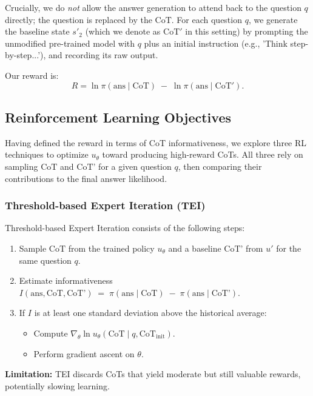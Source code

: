 \documentclass[letterpaper]{article} %
\begin{document}
Crucially, we do \emph{not} allow the answer generation to attend back to the question $q$ directly; the question is replaced by the $\text{CoT}$. For each question $q$, we generate the baseline state $s'_2$ (which we denote as $\text{CoT}'$ in this setting) by prompting the unmodified pre-trained model with $q$ plus an initial instruction (e.g., 'Think step-by-step...'), and recording its raw output.

Our reward is:
\[
R = \ln \pi(\text{ans} \mid \text{CoT}) \;-\; \ln \pi(\text{ans} \mid \text{CoT}').
\]

\subsection{Reinforcement Learning Objectives}
\label{subsec:rl_objectives}
Having defined the reward in terms of CoT informativeness, we explore three RL techniques to optimize $u_\theta$ toward producing high-reward CoTs. All three rely on sampling $\text{CoT}$ and $\text{CoT'}$ for a given question $q$, then comparing their contributions to the final answer likelihood. 

\subsubsection{Threshold-based Expert Iteration (TEI)}
\label{subsubsec:tei}
Threshold-based Expert Iteration consists of the following steps:
\begin{enumerate}
    \item Sample $\text{CoT}$ from the trained policy $u_\theta$ and a baseline $\text{CoT'}$ from $u'$ for the same question $q$.
    \item Estimate informativeness $I(\text{ans}, \text{CoT}, \text{CoT'}) \;=\; \pi(\text{ans}\mid \text{CoT}) \;-\; \pi(\text{ans}\mid \text{CoT'})$.
    \item If $I$ is at least one standard deviation above the historical average:
\begin{itemize}
            \item Compute $\nabla_\theta \ln u_\theta(\text{CoT} \mid q, \text{CoT}_{\text{init}})$.
            \item Perform gradient ascent on $\theta$.
\end{itemize}
\end{enumerate}
\noindent
\textbf{Limitation:} TEI discards CoTs that yield moderate but still valuable rewards, potentially slowing learning.
\end{document}

